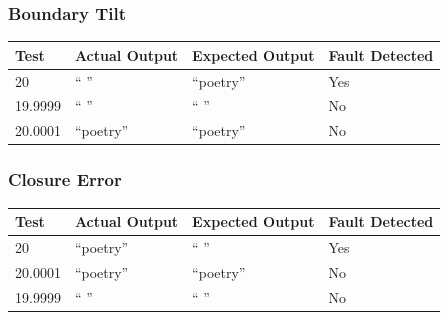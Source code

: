 \documentclass[11pt, oneside]{article}   	%
\begin{document}
\subsubsection{Boundary Tilt}
\begin{table}[!htb]
\centering
\begin{tabular}{|l|l|l|l|}
\hline
Test    & Actual Output & Expected Output & Fault Detected \\ \hline
20      & “ ”           & “poetry”        & Yes            \\ \hline
19.9999 & “ ”           & “ ”             & No             \\ \hline
20.0001 & “poetry”      & “poetry”        & No             \\ \hline
\end{tabular}
\end{table}

\subsubsection{Closure Error}
\begin{table}[!htb]
\centering
\begin{tabular}{|l|l|l|l|}
\hline
Test    & Actual Output & Expected Output & Fault Detected \\ \hline
20      & “poetry”      & “ ”             & Yes            \\ \hline
20.0001 & “poetry”      & “poetry”        & No             \\ \hline
19.9999 & “ ”           & “ ”             & No             \\ \hline
\end{tabular}
\end{table}
\newpage
\end{document}
